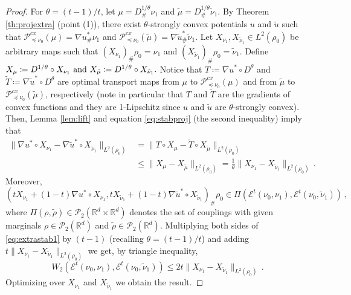 \documentclass[10pt,a4paper]{amsart}
\def\mc#1{\mathcal{#1}}
\begin{document}
\begin{proof} 
For $\theta = (t-1)/t$, 
let $\mu = D^{1/\theta}_\# \nu_1$ and $ \tilde{\mu} = D^{1/\theta}_\# \tilde{\nu}_1$. By Theorem \ref{th:projextra} (point (1)), there exist $\theta$-strongly convex potentials $u$ and $\tilde{u}$ such that $\mathscr{P}^{cx}_{\preceq \nu_0}(\mu) = \nabla u^*_\# \nu_1$ and $\mathscr{P}^{cx}_{\preceq \nu_0}(\tilde{\mu}) = \nabla \tilde{u}^*_\# \tilde{\nu}_1$. 
Let $X_{\nu_1}, X_{\tilde{\nu}_1}\in L^2(\rho_0)$ be arbitrary maps such that $(X_{\nu_1})_\# \rho_0 = \nu_1$ and $(X_{\tilde{\nu}_1})_\# \rho_0 = \tilde{\nu}_1$. 
{Define
$\hbox{$X_\mu \coloneqq D^{1/\theta} \circ X_{\nu_1}$ and $X_{\tilde{\mu}} \coloneqq D^{1/\theta} \circ X_{\tilde{\nu}_1}$.}$
 Notice that  $T\coloneqq \nabla u^* \circ D^{\theta}$ and $\tilde{T} \coloneqq \nabla \tilde{u}^* \circ D^\theta$ are optimal transport maps  from $\mu$ to $\mathscr{P}^{cx}_{\preceq \nu_0}(\mu)$ and from $\tilde{\mu}$ to $\mathscr{P}^{cx}_{\preceq \nu_0}(\tilde{\mu})$, respectively (note in particular that $T$ and $\tilde{T}$ are the gradients of convex functions and they are 1-Lipschitz since $u$ and $\tilde{u}$ are} $\theta$-strongly convex).
Then, Lemma \ref{lem:lift} and equation \eqref{eq:stabproj} (the second inequality) imply that
\begin{align}\label{eq:extrastab1}
\|\nabla u^*\circ X_{\nu_1} - \nabla \tilde{u}^*\circ X_{\tilde{\nu}_1}\|_{L^2(\rho_0)}&  = \| T\circ X_\mu - \tilde{T}\circ X_{\tilde{\mu}} \|_{L^2(\rho_0)} \\\nonumber
& \le  \|  X_\mu -  X_{\tilde{\mu}} \|_{L^2(\rho_0)}
 = \frac{1}{\theta} \|X_{\nu_1} - X_{\tilde{\nu}_1}\|_{L^2(\rho_0)}\,.
\end{align}
Moreover, \[(tX_{\nu_1} + (1-t) \nabla u^*\circ X_{\nu_1},tX_{\tilde{\nu}_1} + (1-t)  \nabla \tilde{u}^*\circ X_{\tilde{\nu}_1})_\# \rho_0 \in \Pi(\mathscr{E}^t(\nu_0,\nu_1), \mathscr{E}^t(\nu_0,\tilde{\nu}_1))\,,\]
where $\Pi(\rho,\tilde{\rho})\in\mc{P}_2(\mathbb{R}^d\times \mathbb{R}^d)$ denotes the set of couplings with given marginals $\rho\in\mc{P}_2(\mathbb{R}^d)$ and $\tilde{\rho}\in\mc{P}_2(\mathbb{R}^d)$. Multiplying both sides of \eqref{eq:extrastab1} by $(t-1)$ (recalling $\theta = (t-1)/t$) and adding $t\|X_{\nu_1} - X_{\tilde{\nu}_1}\|_{L^2(\rho_0)}$ we get, by triangle inequality,
\[
{W_2(\mathscr{E}^t(\nu_0,\nu_1),\mathscr{E}^t(\nu_0,\tilde{\nu}_1))}\leq  2  t \|X_{\nu_1} - X_{\tilde{\nu}_1}\|_{L^2(\rho_0)}\,.
\]
Optimizing over $X_{\nu_1}$ and $ X_{\tilde{\nu}_1}$ we obtain the result. 
\end{proof}
\end{document}
